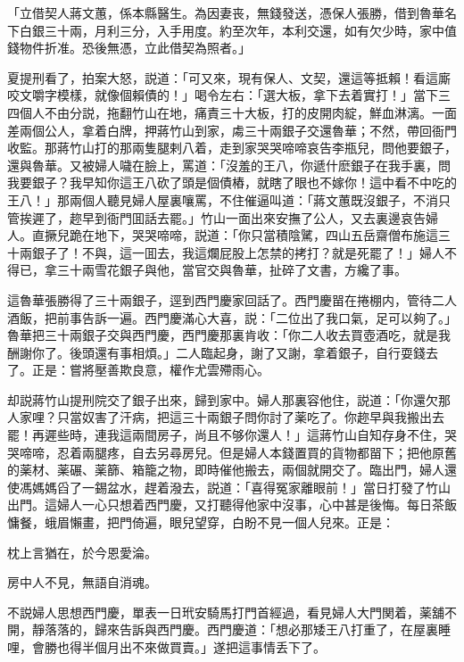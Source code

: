 「立借契人蔣文蕙，係本縣醫生。為因妻丧，無錢發送，憑保人張勝，借到魯華名下白銀三十兩，月利三分，入手用度。約至次年，本利交還，如有欠少時，家中值錢物件折准。恐後無憑，立此借契為照者。」

夏提刑看了，拍案大怒，説道：「可又來，現有保人、文契，還這等抵賴！看這廝咬文嚼字模樣，就像個賴債的！」喝令左右：「選大板，拿下去着實打！」當下三四個人不由分説，拖翻竹山在地，痛責三十大板，打的皮開肉綻，鮮血淋漓。一面差兩個公人，拿着白牌，押蔣竹山到家，䖏三十兩銀子交還魯華；不然，帶回衙門收監。那蔣竹山打的那兩隻腿剌八着，走到家哭哭啼啼哀告李瓶兒，問他要銀子，還與魯華。又被婦人噦在臉上，罵道：「沒羞的王八，你遞什麽銀子在我手裏，問我要銀子？我早知你這王八砍了頭是個債樁，就瞎了眼也不嫁你！這中看不中吃的王八！」那兩個人聽見婦人屋裏嚷罵，不住催逼叫道：「蔣文蕙既沒銀子，不消只管挨遲了，趂早到衙門囬話去罷。」竹山一面出來安撫了公人，又去裏邊哀告婦人。直撅兒跪在地下，哭哭啼啼，説道：「你只當積陰騭，四山五岳齋僧布施這三十兩銀子了！不與，這一囬去，我這爛屁股上怎禁的拷打？就是死罷了！」婦人不得已，拿三十兩雪花銀子與他，當官交與魯華，扯碎了文書，方纔了事。

這魯華張勝得了三十兩銀子，逕到西門慶家回話了。西門慶㽞在捲棚内，管待二人酒飯，把前事告訴一遍。西門慶滿心大喜，説：「二位出了我口氣，足可以夠了。」魯華把三十兩銀子交與西門慶，西門慶那裏肯收：「你二人收去買壺酒吃，就是我酬謝你了。後頭還有事相煩。」二人臨起身，謝了又謝，拿着銀子，自行耍錢去了。正是：嘗將壓善欺良意，權作尤雲殢雨心。

却説蔣竹山提刑院交了銀子出來，歸到家中。婦人那裏容他住，説道：「你還欠那人家哩？只當奴害了汗病，把這三十兩銀子問你討了薬吃了。你趂早與我搬出去罷！再遲些時，連我這兩間房子，尚且不够你還人！」這蔣竹山自知存身不住，哭哭啼啼，忍着兩腿疼，自去另尋房兒。但是婦人本錢置買的貨物都㽞下；把他原舊的薬材、薬碾、薬篩、箱籠之物，即時催他搬去，兩個就開交了。臨出門，婦人還使馮媽媽舀了一錫盆水，趕着潑去，説道：「喜得冤家離眼前！」當日打發了竹山出門。這婦人一心只想着西門慶，又打聽得他家中沒事，心中甚是後悔。每日茶飯慵餐，蛾眉懶畫，把門倚遍，眼兒望穿，白盼不見一個人兒來。正是：

枕上言猶在，於今恩愛淪。

房中人不見，無語自消魂。

不説婦人思想西門慶，單表一日玳安騎馬打門首經過，看見婦人大門関着，薬舖不開，靜落落的，歸來告訴與西門慶。西門慶道：「想必那矮王八打重了，在屋裏睡哩，會勝也得半個月出不來做買賣。」遂把這事情丢下了。

